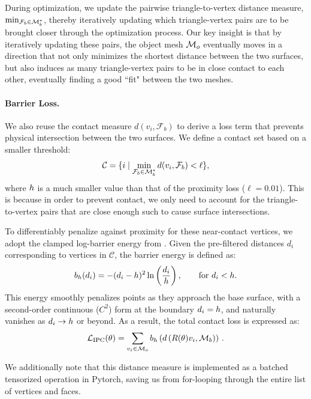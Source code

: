 During optimization, we update the pairwise triangle-to-vertex distance measure, $\min_{\mathcal{F}_b \in \mathcal{M}_b^*}$, thereby iteratively updating which triangle-vertex pairs are to be brought closer through the optimization process. Our key insight is that by iteratively updating these pairs, the object mesh $\mathcal{M}_o$ eventually moves in a direction that not only minimizes the shortest distance between the two surfaces, but also induces as many triangle-vertex pairs to be in close contact to each other, eventually finding a good ``fit" between the two meshes.


\paragraph{Barrier Loss.}
We also reuse the contact measure $d(v_i, \mathcal{F}_b)$ to derive a loss term that prevents physical intersection between the two surfaces. 
We define a contact set based on a smaller threshold:
\[
\mathcal{C} = \{ i \mid \min_{\mathcal{F}_b \in \mathcal{M}_b^*} d(v_i, \mathcal{F}_b) < \ell \},
\]
where $h$ is a much smaller value than that of the proximity loss ($\ell=0.01$). This is because in order to prevent contact, we only need to account for the triangle-to-vertex pairs that are close enough such  to cause surface intersections.  

To differentiably penalize against proximity for these near-contact vertices, we adopt the clamped log-barrier energy from \cite{li2020incremental}. Given the pre-filtered distances $d_i$ corresponding to vertices in $\mathcal{C}$, the barrier energy is defined as:
\[
b_{h}(d_i) = 
-(d_i - h)^2 \ln\left( \dfrac{d_i}{h} \right),
\qquad \text{for } d_i < h.
\]
This energy smoothly penalizes points as they approach the base surface, with a second-order continuous (\( C^2 \)) form at the boundary $d_i = h$, and naturally vanishes as $d_i \to h$ or beyond. As a result, the total contact loss is expressed as:
\begin{equation}
\mathcal{L}_{\text{IPC}}(\theta) = \sum_{v_i \in \mathcal{M}_o} b_{h}\left(d\left(R(\theta)v_i,\mathcal{M}_b\right)\right)\,.
\label{contact_loss}
\end{equation}

We additionally note that this distance measure is implemented as a batched tensorized operation in Pytorch, saving us from for-looping through the entire list of vertices and faces.

